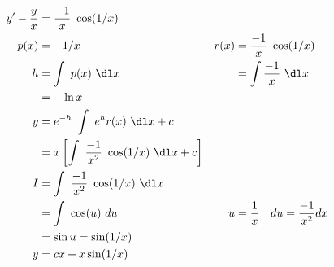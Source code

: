 \begin{enumerate}
\begin{enumerate}
                    \begin{align}
                        y' - \frac{y}{x} & = \frac{-1}{x}\ \cos(1/x)                                                                                           \\
                        p(x)             & = -1/x                                                          & r(x) & = \frac{-1}{x}\ \cos(1/x)                  \\
                        h                & = \int\ p(x)\ \dl x                                             &      & = \int \frac{-1}{x}\ \dl x                 \\
                                         & = -\ln x                                                                                                            \\
                        y                & = e^{-h}\ \int\ e^{h}r(x)\ \dl x + c                                                                                \\
                                         & = x \left[ \int\ \frac{-1}{x^{2}}\ \cos(1/x)\ \dl x + c \right]                                                     \\
                        I                & =\int\ \frac{-1}{x^{2}}\ \cos(1/x)\ \dl x                                                                           \\
                                         & =\int\ \cos(u)\ du                                              & u    & = \frac{1}{x}\quad du = \frac{-1}{x^{2}}dx \\
                                         & = \sin u = \sin(1/x)                                                                                                \\
                        y                & = cx + x\sin(1/x)
                    \end{align}


\end{enumerate}
\end{enumerate}
